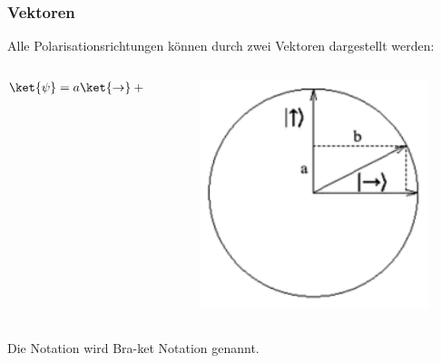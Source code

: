 \documentclass{beamer}
\begin{document}
\begin{frame}
\frametitle{Vektoren}
Alle Polarisationsrichtungen können durch zwei Vektoren dargestellt werden:
\begin{columns}
    \begin{column}{5cm}
        \begin{align*}
            \ket{\psi} &= a\ket{\to} + b\ket{\uparrow}
        \end{align*}
    \end{column}
    \begin{column}{5cm}
        \begin{figure}
            \centering
            \includegraphics[height=0.5\textheight]{fig24.png}
            \label{fig24}
        \end{figure}
    \end{column}
\end{columns}
Die Notation wird Bra-ket Notation genannt.
\end{frame}
\end{document}
